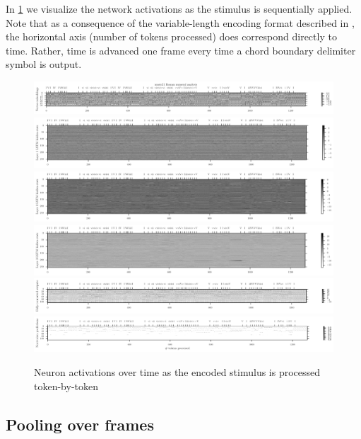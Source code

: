 In \cref{fig:model-analysis-tokens} we visualize the network activations as
the stimulus is sequentially applied. Note that as a consequence of the
variable-length encoding format described in , the horizontal axis
(number of tokens processed) does correspond directly to time. Rather, time
is advanced one frame every time a chord boundary delimiter symbol is output.

\begin{figure}[htpb]
    \centering
    \includegraphics[width=1.0\linewidth]{model-analysis-tokens-0.pdf}
    \includegraphics[width=1.0\linewidth]{model-analysis-tokens-1.pdf}
    \includegraphics[width=1.0\linewidth]{model-analysis-tokens-2.pdf}
    \includegraphics[width=1.0\linewidth]{model-analysis-tokens-3.pdf}
    \includegraphics[width=1.0\linewidth]{model-analysis-tokens-4.pdf}
    \includegraphics[width=1.0\linewidth]{model-analysis-tokens-5.pdf}
    \caption{Neuron activations over time as the encoded stimulus is processed token-by-token}
    \label{fig:model-analysis-tokens}
\end{figure}

\subsection{Pooling over frames}

